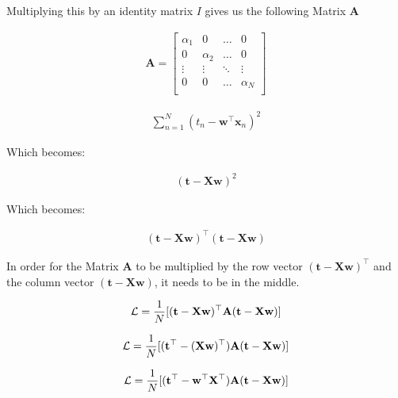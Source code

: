 \documentclass[10pt]{article}
\begin{document}
\begin{itemize}
Multiplying this by an identity matrix $I$ gives us the following Matrix $\mathbf{A}$

\begin{eqnarray*}
\mathbf{A} = 
    \begin{bmatrix}
    \alpha_1 & 0 & \hdots & 0 \\[0.3em]
    0 & \alpha_2 & \hdots & 0 \\[0.3em]
    \vdots & \vdots & \ddots & \vdots \\[0.3em]
    0 & 0 & \hdots & {\alpha_N} \\[0.3em]
    \end{bmatrix}
\end{eqnarray*}

\begin{eqnarray*}
\sum_{n=1}^N \left( t_n - \mathbf{w}^\top \mathbf{x}_n \right)^2
\end{eqnarray*}

Which becomes:

\begin{eqnarray*}
(\mathbf{t} - \mathbf{X} \mathbf{w})^2
\end{eqnarray*}

Which becomes:

\begin{eqnarray*}
(\mathbf{t} - \mathbf{X} \mathbf{w})^\top  (\mathbf{t} - \mathbf{X} \mathbf{w})
\end{eqnarray*}

In order for the Matrix $\mathbf{A}$ to be multiplied by the row vector $(\mathbf{t} - \mathbf{X} \mathbf{w})^\top$ and the column vector $(\mathbf{t} - \mathbf{X} \mathbf{w})$, it needs to be in the middle. 

\begin{eqnarray*}
\mathcal{L} = {1 \over N} [ (\mathbf{t} - \mathbf{X} \mathbf{w})^\top \mathbf{A} (\mathbf{t} - \mathbf{X} \mathbf{w}) ]
\end{eqnarray*}

\begin{eqnarray*}
\mathcal{L} = {1 \over N} [ (\mathbf{t}^\top - (\mathbf{X} \mathbf{w})^\top ) \mathbf{A} (\mathbf{t} - \mathbf{X} \mathbf{w}) ]
\end{eqnarray*}


\begin{eqnarray*}
\mathcal{L} = {1 \over N} [ (\mathbf{t}^\top -  \mathbf{w}^\top \mathbf{X}^\top ) \mathbf{A} (\mathbf{t} - \mathbf{X} \mathbf{w}) ]
\end{eqnarray*}



\end{itemize}
\end{document}
